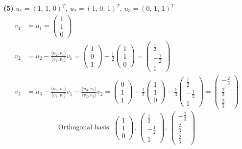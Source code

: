 \noindent\textbf{(5)} $u_1=(1,\,1,\,0)^T,\ u_2=(1,\,0,\,1)^T,\ u_3=(0,\,1,\,1)^T$
\begin{align*}
v_1&=u_1=\begin{pmatrix}1 \\ 1 \\ 0\end{pmatrix} \\
v_2&=u_2-\frac{\langle u_2,v_1\rangle}{\langle v_1,v_1\rangle}v_1=\begin{pmatrix}1 \\ 0 \\ 1\end{pmatrix}-\frac{1}{2}\begin{pmatrix}1 \\ 1 \\ 0\end{pmatrix}=\begin{pmatrix}\frac{1}{2} \\ - \frac{1}{2} \\ 1\end{pmatrix} \\
v_3&=u_3-\frac{\langle u_3,v_1\rangle}{\langle v_1,v_1\rangle}v_1-\frac{\langle u_3,v_2\rangle}{\langle v_2,v_2\rangle}v_2=\begin{pmatrix}0 \\ 1 \\ 1\end{pmatrix}-\frac{1}{2}\begin{pmatrix}1 \\ 1 \\ 0\end{pmatrix} -\frac{1}{3}\begin{pmatrix}\frac{1}{2} \\ - \frac{1}{2} \\ 1\end{pmatrix}=\begin{pmatrix}- \frac{2}{3} \\ \frac{2}{3} \\ \frac{2}{3}\end{pmatrix}
\end{align*}
\[ \text{Orthogonal basis: }\begin{pmatrix}1 \\ 1 \\ 0\end{pmatrix},\ \begin{pmatrix}\frac{1}{2} \\ - \frac{1}{2} \\ 1\end{pmatrix},\ \begin{pmatrix}- \frac{2}{3} \\ \frac{2}{3} \\ \frac{2}{3}\end{pmatrix} \]
